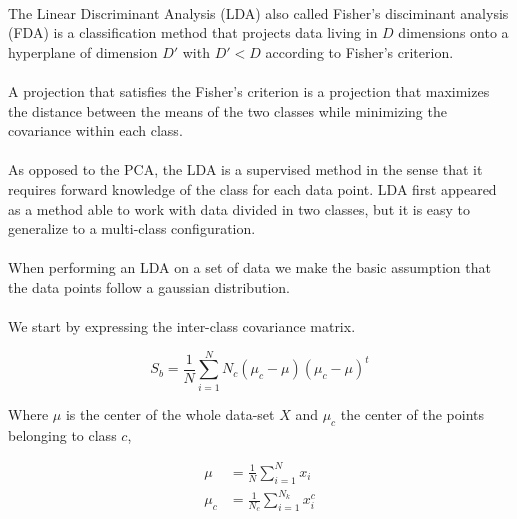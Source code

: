
\paragraph{}
The Linear Discriminant Analysis (LDA) also called Fisher's disciminant analysis (FDA) is a classification method that projects data living in $D$ dimensions onto a hyperplane of dimension $D'$ with $D' < D$ according to Fisher's criterion. 

\paragraph{}
A projection that satisfies the Fisher's criterion is a projection that maximizes the distance between the means of the two classes while minimizing the covariance within each class.

\paragraph{}
As opposed to the PCA, the LDA is a supervised method in the sense that it requires forward
knowledge of the class for each data point. LDA first appeared as a method able to work with data
divided in two classes, but it is easy to generalize to a multi-class configuration.

\paragraph{}
When performing an LDA on a set of data we make the basic assumption that the data points follow a
gaussian distribution.

\paragraph{}
We start by expressing the inter-class covariance matrix.

\begin{equation*}
S_b = \frac{1}{N}\sum_{i = 1}^N N_c(\mu_c - \mu)(\mu_c - \mu)^t
\end{equation*}

Where $\mu$ is the center of the whole data-set $X$ and $\mu_c$ the center of the points belonging to
class $c$,

\begin{align*}
\mu &= \frac{1}{N}\sum_{i = 1}^{N} x_i \\
\mu_c &= \frac{1}{N_c}\sum_{i = 1}^{N_k} x_i^c
\end{align*}

